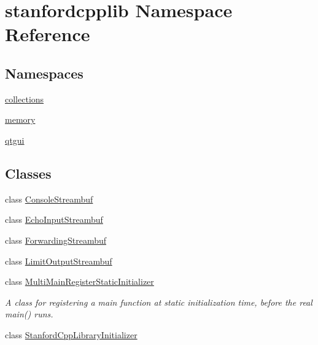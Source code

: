 \hypertarget{namespacestanfordcpplib}{}\section{stanfordcpplib Namespace Reference}
\label{namespacestanfordcpplib}
\subsection*{Namespaces}
\begin{DoxyCompactItemize}
\item 
 \mbox{\hyperlink{namespacestanfordcpplib_1_1collections}{collections}}
\item 
 \mbox{\hyperlink{namespacestanfordcpplib_1_1memory}{memory}}
\item 
 \mbox{\hyperlink{namespacestanfordcpplib_1_1qtgui}{qtgui}}
\end{DoxyCompactItemize}
\subsection*{Classes}
\begin{DoxyCompactItemize}
\item 
class \mbox{\hyperlink{classstanfordcpplib_1_1ConsoleStreambuf}{Console\+Streambuf}}
\item 
class \mbox{\hyperlink{classstanfordcpplib_1_1EchoInputStreambuf}{Echo\+Input\+Streambuf}}
\item 
class \mbox{\hyperlink{classstanfordcpplib_1_1ForwardingStreambuf}{Forwarding\+Streambuf}}
\item 
class \mbox{\hyperlink{classstanfordcpplib_1_1LimitOutputStreambuf}{Limit\+Output\+Streambuf}}
\item 
class \mbox{\hyperlink{classstanfordcpplib_1_1MultiMainRegisterStaticInitializer}{Multi\+Main\+Register\+Static\+Initializer}}
\begin{DoxyCompactList}\small\item\em A class for registering a main function at static initialization time, before the real main() runs. \end{DoxyCompactList}\item 
class \mbox{\hyperlink{classstanfordcpplib_1_1StanfordCppLibraryInitializer}{Stanford\+Cpp\+Library\+Initializer}}
\end{DoxyCompactItemize}
